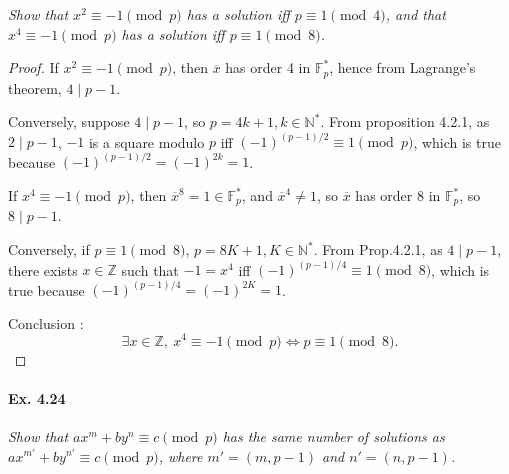 \documentclass[11pt,a4paper]{article}
\newcommand{\Z}{\mathbb{Z}}
\newcommand{\N}{\mathbb{N}}
\newcommand{\F}{\mathbb{F}}
\begin{document}
{\it Show that $x^2 \equiv -1 \pmod p$ has a solution iff $p \equiv 1 \pmod 4$, and that $x^4 \equiv -1 \pmod p$ has a solution iff $p \equiv 1 \pmod 8$.
}

\begin{proof}
If $x^2\equiv -1 \pmod p$, then  $\overline{x}$ has order 4 in  $\F_p^*$, hence from Lagrange's theorem, $4 \mid p-1$.

Conversely, suppose $4 \mid p-1$, so $p = 4k+1, k \in \N^*$.  From proposition 4.2.1, as $2 \mid p-1$, $-1$ is a square modulo $p$ iff $(-1)^{(p-1)/2} \equiv 1 \pmod p$, which is true because $(-1) ^{(p-1)/2} =(-1)^{2k} = 1$.

If $x^4 \equiv -1 \pmod p$, then $\overline{x}^8 = 1 \in \F_p^*$, and $\overline{x}^4 \ne 1$, so $\overline{x}$ has order $8$ in $\F_p^*$, so $8 \mid p-1$.

Conversely, if $p\equiv 1 \pmod 8$, $p = 8K+1, K\in \N^*$. From Prop.4.2.1, as $4 \mid p-1$, there exists $x \in \Z$ such that $-1 = x^4$ iff $(-1)^{(p-1)/4} \equiv 1 \pmod 8$, which is true because $(-1)^{(p-1)/4} = (-1)^{2K} = 1$.

Conclusion : 
$$\exists x \in \Z, \ x^4 \equiv -1 \pmod p \iff p \equiv 1 \pmod 8.$$
\end{proof}

\paragraph{Ex. 4.24}

{\it Show that $a x^m + b y^n \equiv c \pmod p$ has the same number of solutions as $a x^{m'} + b y^{n'} \equiv c \pmod p$, where $m' = (m,p-1)$ and $n' = (n, p-1)$.
}
\end{document}
